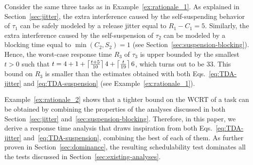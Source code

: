 \begin{example}
\label{ex:rationale_2}  
Consider the same three tasks as in Example~\ref{ex:rationale_1}. As explained in Section~\ref{sec:jitter}, the extra interference caused by the self-suspending behavior of $\tau_1$ can be safely modeled by a release jitter equal to $R_1 - C_1 = 5$. Similarly, the extra interference caused by the self-suspension of $\tau_2$ can be modeled by a blocking time equal to $\min(C_2,S_2) = 1$ (see Section~\ref{sec:suspension-blocking}). Hence, the worst-case response time $R_3$ of $\tau_3$ is upper bounded by the smallest $t>0$ such that $t = 4 + 1 +\left\lceil{ \frac{t + 5}{10} }\right\rceil 4 +\left\lceil{ \frac{t}{19} }\right\rceil 6$, which turns out to be $33$. This bound on $R_3$ is smaller than the estimates obtained with both Eqs.~\eqref{eq:TDA-jitter} and \eqref{eq:TDA-suspension} (see Example~\ref{ex:rationale_1}).
\hfill\myendproof
\end{example}


Example~\ref{ex:rationale_2} shows that a tighter bound on the WCRT of a task can be obtained by combining the properties of the analyses discussed in both Section~\ref{sec:jitter} and~\ref{sec:suspension-blocking}. Therefore, in this paper, we derive a response time analysis that draws inspiration from both Eqs.~\eqref{eq:TDA-jitter} and~\eqref{eq:TDA-suspension}, combining the best of each of them. As further proven in Section~\ref{sec:dominance}, the resulting schedulability test dominates all the tests discussed in Section~\ref{sec:existing-analyses}.




